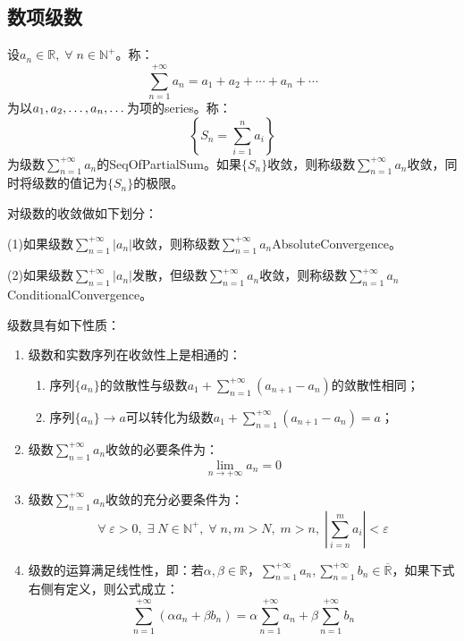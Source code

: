 \subsection{数项级数}
\begin{definition}
	设$a_n\in\mathbb{R},\;\forall\;n\in\mathbb{N}^+$。称：
	\begin{equation*}
		\sum_{n=1}^{+\infty}a_n=a_1+a_2+\cdots+a_n+\cdots
	\end{equation*}
	为以$a_1, a_2, \dots, a_{n},\dots$为项的\gls{series}。称：
	\begin{equation*}
		\left\{S_n=\sum_{i=1}^na_i\right\}
	\end{equation*}
	为级数$\sum\limits_{n=1}^{+\infty}a_n$的\gls{SeqOfPartialSum}。如果$\{S_n\}$收敛，则称级数$\sum\limits_{n=1}^{+\infty}a_n$收敛，同时将级数的值记为$\{S_n\}$的极限。
\end{definition}
\begin{definition}
	对级数的收敛做如下划分：\par
	(1)如果级数$\sum\limits_{n=1}^{+\infty}|a_n|$收敛，则称级数$\sum\limits_{n=1}^{+\infty}a_n$\gls{AbsoluteConvergence}。\par
	(2)如果级数$\sum\limits_{n=1}^{+\infty}|a_n|$发散，但级数$\sum\limits_{n=1}^{+\infty}a_n$收敛，则称级数$\sum\limits_{n=1}^{+\infty}a_n$\gls{ConditionalConvergence}。
\end{definition}
\begin{property}\label{prop:Series}
	级数具有如下性质：
	\begin{enumerate}
		\item 级数和实数序列在收敛性上是相通的：
		\begin{enumerate}
			\item 序列$\{a_n\}$的敛散性与级数$a_1+\sum\limits_{n=1}^{+\infty}(a_{n+1}-a_n)$的敛散性相同；
			\item 序列$\{a_n\}\to a$可以转化为级数$a_1+\sum\limits_{n=1}^{+\infty}(a_{n+1}-a_n)=a$；
		\end{enumerate}
		\item 级数$\sum\limits_{n=1}^{+\infty}a_n$收敛的必要条件为：
		\begin{equation*}
			\lim_{n\to+\infty}a_n=0
		\end{equation*}
		\item 级数$\sum\limits_{n=1}^{+\infty}a_n$收敛的充分必要条件为：
		\begin{equation*}
			\forall\;\varepsilon>0,\;\exists\;N\in\mathbb{N}^+,\;\forall\;n,m>N,\;m>n,\;\left|\sum_{i=n}^ma_i\right|<\varepsilon
		\end{equation*}
		\item 级数的运算满足线性性，即：若$\alpha,\beta\in\mathbb{R}$，$\sum\limits_{n=1}^{+\infty}a_n,\sum\limits_{n=1}^{+\infty}b_n\in\overline{\mathbb{R}}$，如果下式右侧有定义，则公式成立：
		\begin{equation*}
			\sum_{n=1}^{+\infty}(\alpha a_n+\beta b_n)=\alpha\sum_{n=1}^{+\infty}a_n+\beta\sum_{n=1}^{+\infty}b_n
		\end{equation*}
	\end{enumerate}
\end{property}
